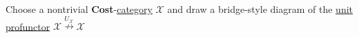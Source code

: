 Choose a nontrivial \textbf{Cost}-\href{doc/1 math/Seven Sketches in Compositionality/Chapter 2: Resource theories/3 Enrichment/1 V-categories/1 V-category}{category} $\mathcal{X}$ and draw a bridge-style diagram of the \href{doc/1 math/Seven Sketches in Compositionality/Chapter 4: Co-design/3 Categories of profunctors/2 The categories V-Prof and Feas/1 V-profunctor category}{unit profunctor} $\mathcal{X} \overset{U_\mathcal{X}}\nrightarrow \mathcal{X}$